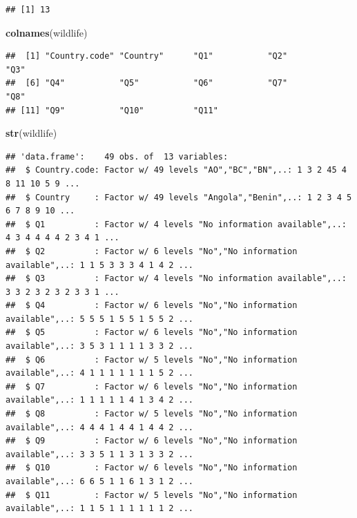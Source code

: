 \documentclass[
  12pt,
]{article}
\newenvironment{Shaded}{\begin{snugshade}}{\end{snugshade}}
\newcommand{\KeywordTok}[1]{\textcolor[rgb]{0.13,0.29,0.53}{\textbf{#1}}}
\newcommand{\NormalTok}[1]{#1}
\begin{document}
\begin{verbatim}
## [1] 13
\end{verbatim}

\begin{Shaded}
\begin{Highlighting}[]
\KeywordTok{colnames}\NormalTok{(wildlife)}
\end{Highlighting}
\end{Shaded}

\begin{verbatim}
##  [1] "Country.code" "Country"      "Q1"           "Q2"           "Q3"          
##  [6] "Q4"           "Q5"           "Q6"           "Q7"           "Q8"          
## [11] "Q9"           "Q10"          "Q11"
\end{verbatim}

\begin{Shaded}
\begin{Highlighting}[]
\KeywordTok{str}\NormalTok{(wildlife)}
\end{Highlighting}
\end{Shaded}

\begin{verbatim}
## 'data.frame':    49 obs. of  13 variables:
##  $ Country.code: Factor w/ 49 levels "AO","BC","BN",..: 1 3 2 45 4 8 11 10 5 9 ...
##  $ Country     : Factor w/ 49 levels "Angola","Benin",..: 1 2 3 4 5 6 7 8 9 10 ...
##  $ Q1          : Factor w/ 4 levels "No information available",..: 4 3 4 4 4 4 2 3 4 1 ...
##  $ Q2          : Factor w/ 6 levels "No","No information available",..: 1 1 5 3 3 3 4 1 4 2 ...
##  $ Q3          : Factor w/ 4 levels "No information available",..: 3 3 2 3 2 3 2 3 3 1 ...
##  $ Q4          : Factor w/ 6 levels "No","No information available",..: 5 5 5 1 5 5 1 5 5 2 ...
##  $ Q5          : Factor w/ 6 levels "No","No information available",..: 3 5 3 1 1 1 1 3 3 2 ...
##  $ Q6          : Factor w/ 5 levels "No","No information available",..: 4 1 1 1 1 1 1 1 5 2 ...
##  $ Q7          : Factor w/ 6 levels "No","No information available",..: 1 1 1 1 1 4 1 3 4 2 ...
##  $ Q8          : Factor w/ 5 levels "No","No information available",..: 4 4 4 1 4 4 1 4 4 2 ...
##  $ Q9          : Factor w/ 6 levels "No","No information available",..: 3 3 5 1 1 3 1 3 3 2 ...
##  $ Q10         : Factor w/ 6 levels "No","No information available",..: 6 6 5 1 1 6 1 3 1 2 ...
##  $ Q11         : Factor w/ 5 levels "No","No information available",..: 1 1 5 1 1 1 1 1 1 2 ...
\end{verbatim}
\end{document}
